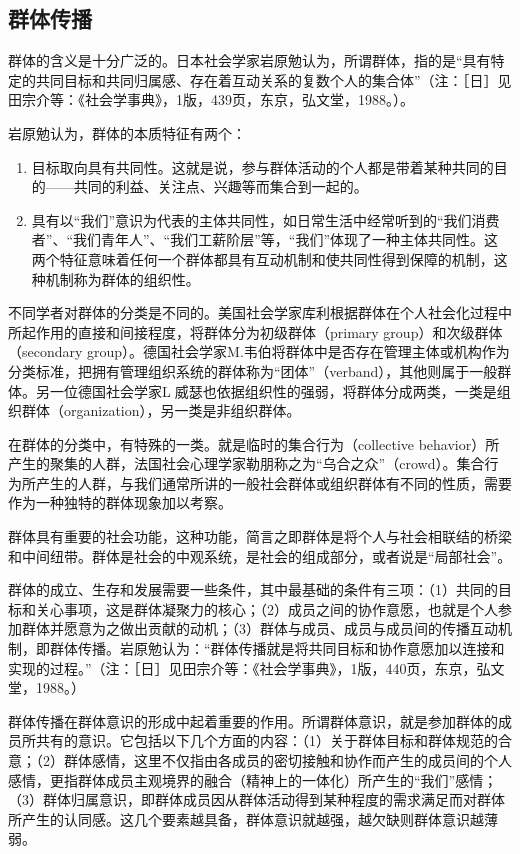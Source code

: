 \documentclass[UTF8,12pt]{ctexart}
\numberwithin{equation}{section} %
\numberwithin{figure}{section}
\numberwithin{table}{section}
\begin{document}
	\subsection{群体传播}
	群体的含义是十分广泛的。日本社会学家岩原勉认为，所谓群体，指的是“具有特定的共同目标和共同归属感、存在着互动关系的复数个人的集合体”（注：［日］见田宗介等：《社会学事典》，1版，439页，东京，弘文堂，1988。）。
	
	岩原勉认为，群体的本质特征有两个：
	\begin{enumerate}
		\item 目标取向具有共同性。这就是说，参与群体活动的个人都是带着某种共同的目的——共同的利益、关注点、兴趣等而集合到一起的。
		
		\item 具有以“我们”意识为代表的主体共同性，如日常生活中经常听到的“我们消费者”、“我们青年人”、“我们工薪阶层”等，“我们”体现了一种主体共同性。这两个特征意味着任何一个群体都具有互动机制和使共同性得到保障的机制，这种机制称为群体的组织性。
		
	\end{enumerate}
	
	不同学者对群体的分类是不同的。美国社会学家库利根据群体在个人社会化过程中所起作用的直接和间接程度，将群体分为初级群体（primary group）和次级群体（secondary group）。德国社会学家M.韦伯将群体中是否存在管理主体或机构作为分类标准，把拥有管理组织系统的群体称为“团体”（verband），其他则属于一般群体。另一位德国社会学家L威瑟也依据组织性的强弱，将群体分成两类，一类是组织群体（organization），另一类是非组织群体。
	
	在群体的分类中，有特殊的一类。就是临时的集合行为（collective behavior）所产生的聚集的人群，法国社会心理学家勒朋称之为“乌合之众”（crowd）。集合行为所产生的人群，与我们通常所讲的一般社会群体或组织群体有不同的性质，需要作为一种独特的群体现象加以考察。

	
	群体具有重要的社会功能，这种功能，简言之即群体是将个人与社会相联结的桥梁和中间纽带。群体是社会的中观系统，是社会的组成部分，或者说是“局部社会”。
	
	群体的成立、生存和发展需要一些条件，其中最基础的条件有三项：（1）共同的目标和关心事项，这是群体凝聚力的核心；（2）成员之间的协作意愿，也就是个人参加群体并愿意为之做出贡献的动机；（3）群体与成员、成员与成员间的传播互动机制，即群体传播。岩原勉认为：“群体传播就是将共同目标和协作意愿加以连接和实现的过程。”（注：［日］见田宗介等：《社会学事典》，1版，440页，东京，弘文堂，1988。）
	
	群体传播在群体意识的形成中起着重要的作用。所谓群体意识，就是参加群体的成员所共有的意识。它包括以下几个方面的内容：（1）关于群体目标和群体规范的合意；（2）群体感情，这里不仅指由各成员的密切接触和协作而产生的成员间的个人感情，更指群体成员主观境界的融合（精神上的一体化）所产生的“我们”感情；（3）群体归属意识，即群体成员因从群体活动得到某种程度的需求满足而对群体所产生的认同感。这几个要素越具备，群体意识就越强，越欠缺则群体意识越薄弱。
	
\end{document}

